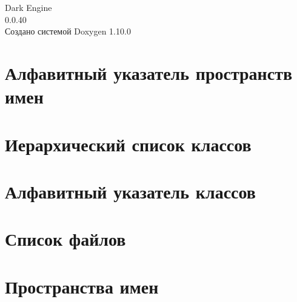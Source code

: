 \documentclass[twoside]{book}
\newcommand{\+}{\discretionary{\mbox{\scriptsize$\hookleftarrow$}}{}{}}
\newcommand{\clearemptydoublepage}{%
    \newpage{\pagestyle{empty}\cleardoublepage}%
  }
\begin{document}
  \raggedbottom
    \hypersetup{pageanchor=false,
                bookmarksnumbered=true,
                pdfencoding=unicode
               }
  \begin{titlepage}
  \vspace*{7cm}
  \begin{center}%
  {\Large Dark Engine}\\
  [1ex]\large 0.\+0.\+40 \\
  \vspace*{1cm}
  {\large Создано системой Doxygen 1.10.0}\\
  \end{center}
  \end{titlepage}
  \clearemptydoublepage
  \tableofcontents
  \clearemptydoublepage
  \hypersetup{pageanchor=true}

\chapter{Алфавитный указатель пространств имен}

\chapter{Иерархический список классов}

\chapter{Алфавитный указатель классов}

\chapter{Список файлов}

\chapter{Пространства имен}











\end{document}
